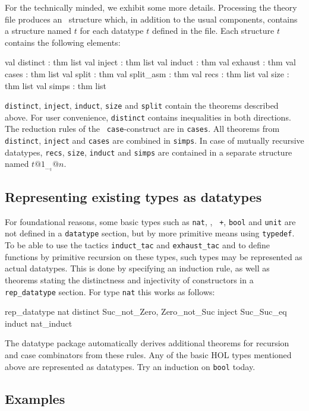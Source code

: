 For the technically minded, we exhibit some more details.  Processing the
theory file produces an \ML\ structure which, in addition to the usual
components, contains a structure named $t$ for each datatype $t$ defined in
the file.  Each structure $t$ contains the following elements:
\begin{ttbox}
val distinct : thm list
val inject : thm list
val induct : thm
val exhaust : thm
val cases : thm list
val split : thm
val split_asm : thm
val recs : thm list
val size : thm list
val simps : thm list
\end{ttbox}
{\tt distinct}, \texttt{inject}, \texttt{induct}, {\tt size}
and {\tt split} contain the theorems
described above.  For user convenience, \texttt{distinct} contains
inequalities in both directions.  The reduction rules of the {\tt
  case}-construct are in \texttt{cases}.  All theorems from {\tt
  distinct}, \texttt{inject} and \texttt{cases} are combined in \texttt{simps}.
In case of mutually recursive datatypes, {\tt recs}, {\tt size}, {\tt induct}
and {\tt simps} are contained in a separate structure named $t@1_\ldots_t@n$.


\subsection{Representing existing types as datatypes}

For foundational reasons, some basic types such as {\tt nat}, {\tt *}, {\tt
  +}, {\tt bool} and {\tt unit} are not defined in a {\tt datatype} section,
but by more primitive means using \texttt{typedef}. To be able to use the
tactics {\tt induct_tac} and {\tt exhaust_tac} and to define functions by
primitive recursion on these types, such types may be represented as actual
datatypes.  This is done by specifying an induction rule, as well as theorems
stating the distinctness and injectivity of constructors in a {\tt
  rep_datatype} section.  For type \texttt{nat} this works as follows:
\begin{ttbox}
rep_datatype nat
  distinct Suc_not_Zero, Zero_not_Suc
  inject   Suc_Suc_eq
  induct   nat_induct
\end{ttbox}
The datatype package automatically derives additional theorems for recursion
and case combinators from these rules.  Any of the basic HOL types mentioned
above are represented as datatypes.  Try an induction on \texttt{bool}
today.


\subsection{Examples}

